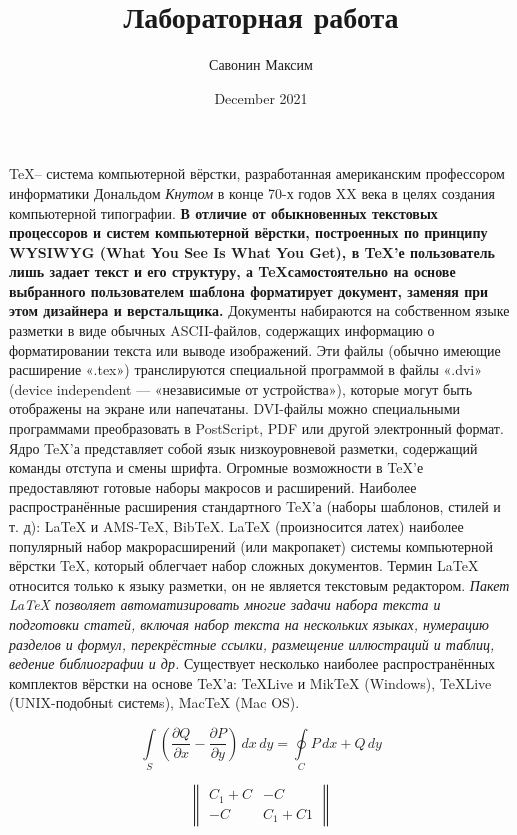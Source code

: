 \documentclass{article}
\title{Лабораторная работа}
\author{Савонин Максим}
\date{December 2021}
\begin{document}
\maketitle

\TeX – система компьютерной вёрстки, разработанная американским профессором информатики Дональдом \textit{Кнутом} в конце 70-х годов XX века в целях создания компьютерной типографии. 
\textbf{В отличие от обыкновенных текстовых процессоров и систем компьютерной вёрстки, построенных по принципу WYSIWYG (What You See Is What You Get), в \TeX’е пользователь лишь задает текст и его структуру, а \TeX самостоятельно на основе выбранного пользователем шаблона форматирует документ, заменяя при этом дизайнера и верстальщика.} Документы набираются на собственном языке разметки в виде обычных ASCII-файлов, содержащих информацию о форматировании текста или выводе изображений. Эти файлы (обычно имеющие расширение «.tex») транслируются специальной программой в файлы «.dvi» (device independent — «независимые от устройства»), которые могут быть отображены на экране или напечатаны. DVI-файлы можно специальными программами преобразовать в PostScript, PDF или другой электронный формат.
Ядро \TeX’а представляет собой язык низкоуровневой разметки, содержащий команды отступа и смены шрифта. Огромные возможности в \TeX’е предоставляют готовые наборы макросов и расширений. Наиболее распространённые расширения стандартного \TeX’а (наборы шаблонов, стилей и т. д): LaTeX и AMS-TeX, BibTeX.
LaTeX (произносится   латех)   наиболее популярный набор макрорасширений (или макропакет) системы компьютерной вёрстки \TeX, который облегчает набор сложных документов. Термин LaTeX относится только к языку разметки, он не является текстовым редактором.
\textsl{Пакет LaTeX позволяет автоматизировать многие задачи набора текста и подготовки статей, включая набор текста на нескольких языках, нумерацию разделов и формул, перекрёстные ссылки, размещение иллюстраций и таблиц, ведение библиографии и др.}
Существует несколько наиболее распространённых комплектов вёрстки на основе \TeX’а: \TeX Live и MikTeX (Windows), \TeX Live (UNIX-подобныt системs), MacTeX (Mac OS).

\begin{equation}
\int \limits_S \left( \frac{\partial Q}{\partial x} - \frac{\partial P}{\partial y} \right)\, dx \, dy =\oint \limits_C P\,dx + Q \, dy
\end{equation}

\begin{equation}
\begin{Vmatrix} C_{1}+C & -C \\ -C & C_{1}+C1 \end{Vmatrix}
\end{equation}
\end{document}
